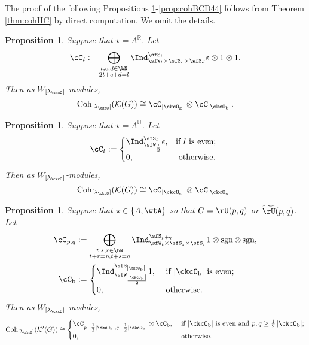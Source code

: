 \documentclass[12pt,a4paper]{amsart}
\def\abs#1{\left|{#1}\right|}
\newcommand{\BH}{{\mathbb {H}}}
\newcommand{\CK}{{\mathcal {K}}}
\newcommand{\sgn}{\operatorname{sgn}}
\renewcommand{\t}{\mathfrak t}
\newcommand{\R}{\mathbb R}
\numberwithin{equation}{section}
\newtheorem{prop}[thm]{Proposition}
\theoremstyle{remark}
\def\half{{\tfrac{1}{2}}}
\def\lamck{\lambda_\ckcO}
\def\Lamck{[\lambda_\ckcO]}
\def\Cint#1{\Coh_{[#1]}}
\def\WLamck{W_{[\lambda_{\ckcO}]}}
\def\tU{\widetilde{\rU}}
\def\Coh{\mathrm{Coh}}
\begin{document}
     The proof of the following Propositions \ref{lem:GL.count00}-\ref{prop:cohBCD44}  follows from Theorem \ref{thm:cohHC} by direct computation. We  omit the details.

   \begin{prop} \label{lem:GL.count00}
 Suppose that $\star=A^\R$.  Let
  \[
    \cC_l := \bigoplus_{\substack{t,c,d\in \bN \\2t+c+d=l}} \Ind_{\sfW_t\times \sfS_c\times \sfS_d}^{\sfS_{l}} \varepsilon \otimes 1\otimes 1.
  \]
  Then as $W_{[\lamck]}$-modules,
  \[
    \Cint{\lamck}(\CK(G)) \cong \cC_{\abs{\ckcO_{\mathrm g}}}\otimes \cC_{\abs{\ckcO_{\mathrm b}}}.
  \]
 \end{prop}


\begin{prop}\label{thm:mainH11}
 Suppose that $\star=A^\BH$.   Let
  \[
  \cC_{l}: = \begin{cases}
    \Ind_{\sfW_{\frac{l}{2}}}^{\sfS_{l}}\epsilon,
    & \text{if $l$ is even;}  \\
      0, & \text{ otherwise. } \\
    \end{cases}
  \]
  Then as $W_{[\lamck]}$-modules,
  \[
    \Cint{\lamck}(\CK(G))  \cong
    \cC_{\abs{\ckcO_{e}}}\otimes \cC_{\abs{\ckcO_{o}}}.
  \]

\end{prop}


\begin{prop}\label{lem:ccrU22}
Suppose that $\star\in \{A, \wtA\}$ so that $
  G =
    \rU(p,q)$ or $
    \tU(p,q)$.   Let
\[
  \begin{split}
    \cC_{p,q} &:= \bigoplus_{\substack{t,s,r\in \bN\\t+r=p, t+s = q}}
    \Ind_{\sfW_{t}\times \sfS_s\times \sfS_r}^{\sfS_{p+q}}
 1\otimes \sgn \otimes \sgn ,\\
 \cC_{\mathrm b} &:= \begin{cases}
  \Ind_{\sfW_{\frac{\abs{\ckcO_{\mathrm b}}}{2}}}^{\sfS_{\abs{\ckcO_{\mathrm b}}}} 1, & \ \text{if $\abs{\ckcO_{\mathrm b}}$ is even};\\
  0, & \ \text{otherwise}.
 \end{cases}
  \end{split}
\]
Then as $\WLamck$-modules,
\[
  \Coh_{\Lamck}(\CK'(G)) \cong \begin{cases}
    \cC_{p-\half \abs{\ckcO_{\mathrm b}},q-\half\abs{\ckcO_{\mathrm b}}}\otimes \cC_{\mathrm b}, &\  \text{if $\abs{\ckcO_{\mathrm b}}$ is even and
      $p,q \geq \half \abs{\ckcO_{\mathrm b}}$};\\
    0, & \ \text{otherwise}.
  \end{cases}
\]
\end{prop}
\end{document}
